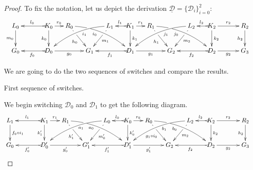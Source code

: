 \documentclass[a4paper,UKenglish,cleveref,pdftex,thm-restate,numberwithinsect,anonymous]{lipics}
\def\G{\textbf {\textup{G}}}
\newcommand{\dder}[1]{\mathscr{#1}}
\newcommand{\der}[1]{\underline{\dder{#1}}}
\begin{document}
\lemSwitchConfluence*
\label{lemSwitchConfluence-proof}

\begin{proof}
	To fix the notation, let us depict the derivation $\der{D}=\{\dder{D}_i\}_{i=0}^2$:
	\[\xymatrix@C=13pt{L_0\ar[d]_{m_0}&& K_0 \ar[d]_{k_0}\ar@{>->}[ll]_{l_0} \ar[r]^{r_0} & R_0 \ar@/^.35cm/[drrr]_(.4){i_0}|(.285)\hole \ar[dr]|(.28)\hole_{h_0} && L_1 \ar@/_.35cm/[dlll]^(.4){i_1} \ar[dl]|(.28)\hole^{m_1}& K_1 \ar[d]^{k_1}\ar@{>->}[l]_{l_1} \ar[r]^{r_1} & R_1 \ar[dr]|(.28)\hole_{h_1} \ar@/^.35cm/[drrr]_(.4){j_0}|(.285)\hole  && L_2 \ar@/_.35cm/[dlll]^(.4){j_1} \ar[dl]|(.28)\hole^{m_2}& K_2 \ar[d]^{k_2}\ar@{>->}[l]_{l_2} \ar[rr]^{r_2} && R_2 \ar[d]_{h_2} \\G_0 && \ar@{>->}[ll]^{f_0} D_0 \ar[rr]_{g_0}&& G_1  && \ar@{>->}[ll]^{f_1} D_1 \ar[rr]_{g_1}&& G_2 && \ar@{>->}[ll]^{f_2} D_2 \ar[rr]_{g_2}&& G_3 }\]
	
	We are going to do the two sequences of switches and compare the results.
	
	\smallskip \noindent First sequence of switches.
	
	We begin switching $\dder{D}_0$ and $\dder{D}_1$ to get the following diagram.
	\[\xymatrix@C=15pt{L_1\ar[d]^{f_0\circ i_1}&& K_1 \ar[d]_{k'_1}\ar@{>->}[ll]_{l_1} \ar[r]^{r_1} & R_1 \ar@/^.35cm/[drrr]_(.4){a_0}|(.285)\hole \ar[dr]|(.28)\hole_{h'_1} && L_0 \ar@/_.35cm/[dlll]^(.4){a_1} \ar[dl]|(.28)\hole^{m'_0}& K_0 \ar[d]^{k'_0}\ar@{>->}[l]_{l_0} \ar[r]^{r_0} & R_0 \ar[dr]|(.28)\hole_{g_1\circ i_0} \ar@/^.35cm/[drrr]_(.4){b_0}|(.285)\hole  && L_2 \ar@/_.35cm/[dlll]^(.4){b_1} \ar[dl]|(.28)\hole^{m_2}& K_2 \ar[d]^{k_2}\ar@{>->}[l]_{l_2} \ar[rr]^{r_2} && R_2 \ar[d]_{h_2} \\G_0 && \ar@{>->}[ll]^{f'_0} D'_0 \ar[rr]_{g'_0}&& G'_1  && \ar@{>->}[ll]^{f'_1} D'_1 \ar[rr]_{g'_1}&& G_2 && \ar@{>->}[ll]^{f_2} D_2 \ar[rr]_{g_2}&& G_3 }\]


\end{proof}
\end{document}
